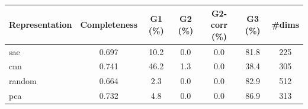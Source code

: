\begin{tabular}{lcccccc}
\toprule
Representation & Completeness & G1 (\%) & G2 (\%) & G2-corr (\%) & G3 (\%) & \#dims \\
\midrule
sae & 0.697 & 10.2 & 0.0 & 0.0 & 81.8 & 225 \\
cnn & 0.741 & 46.2 & 1.3 & 0.0 & 38.4 & 305 \\
random & 0.664 & 2.3 & 0.0 & 0.0 & 82.9 & 512 \\
pca & 0.732 & 4.8 & 0.0 & 0.0 & 86.9 & 313 \\
\bottomrule
\end{tabular}
